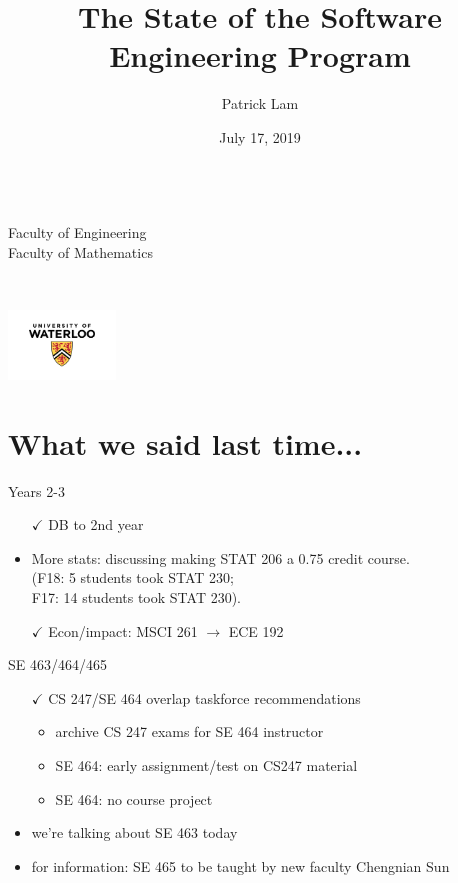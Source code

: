 \documentclass{beamer}
\title{The State of the Software Engineering Program}
\author{Patrick Lam}
\date{July 17, 2019}
\newenvironment{changemargin}[1]{%
  \begin{list}{}{%
    \setlength{\topsep}{0pt}%
    \setlength{\leftmargin}{#1}%
    \setlength{\rightmargin}{1em}
    \setlength{\listparindent}{\parindent}%
    \setlength{\itemindent}{\parindent}%
    \setlength{\parsep}{\parskip}%
  }%
  \item[]}{\end{list}}
\begin{document}
\begin{frame}
  \titlepage

  \vfill
  
  \begin{minipage}{15em}
    \small ~\\[1.5em] Faculty of Engineering\\
    Faculty of Mathematics\\[1.5em]
  \end{minipage}\
  \hfill\
  \begin{minipage}{10em}\hfill \includegraphics[height=5em]{universityofwaterloo_logo_vert_rgb_0-300x195.png}
  \end{minipage}
\end{frame}

\part{What we said last time...}
\frame{\partpage}


\begin{frame}{Years 2-3}
  \Large
  \begin{changemargin}{1em}
    \begin{itemize}
    \item[$\checkmark$] DB to 2nd year
    \item More stats: discussing making STAT 206 a 0.75 credit course.\\
      \qquad       (F18: 5 students took STAT 230; \\
      \qquad F17: 14 students took STAT 230).
      \item[$\checkmark$] Econ/impact: MSCI 261 $\rightarrow$ ECE 192
    \end{itemize}
  \end{changemargin}
\end{frame}

\begin{frame}{SE 463/464/465}
  \Large
  \begin{changemargin}{1em}
    \begin{itemize}
    \item[$\checkmark$] CS 247/SE 464 overlap taskforce recommendations
      \begin{itemize}
      \item archive CS 247 exams for SE 464 instructor
      \item SE 464: early assignment/test on CS247 material
      \item SE 464: no course project
      \end{itemize}
    \item we're talking about SE 463 today
    \item for information: SE 465 to be taught by new faculty Chengnian Sun
    \end{itemize}
  \end{changemargin}
\end{frame}
\end{document}
